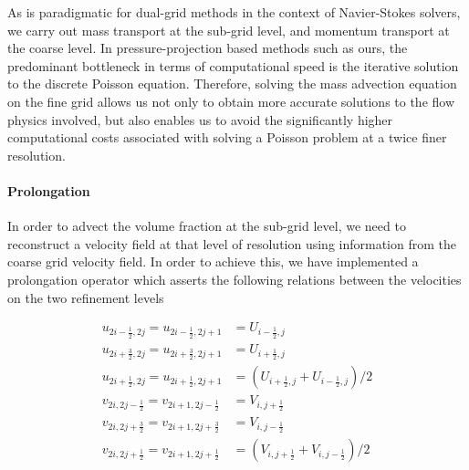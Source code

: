 As is paradigmatic for dual-grid methods in the context of 
Navier-Stokes solvers, we carry out mass transport 
at the sub-grid level, and momentum transport at the coarse level. 
In pressure-projection based methods such as ours, the predominant 
bottleneck in terms of computational speed is the 
iterative solution to the discrete Poisson equation. 
Therefore, solving the mass advection equation on the fine grid 
allows us not only to obtain more accurate solutions to the flow physics 
involved, but also enables us to avoid the significantly higher  
computational costs associated with solving a Poisson problem 
at a twice finer resolution.  

\paragraph{\textbf{Prolongation}}

In order to advect the volume fraction at the sub-grid level, 
we need to reconstruct a velocity field at that level of resolution using 
information from the coarse grid velocity field.
In order to achieve this, we have implemented a prolongation operator 
which asserts the following relations between the velocities on the two refinement levels  

\begin{align}
  	  u_{2i-\frac{1}{2},2j} = u_{2i-\frac{1}{2},2j+1} &= U_{i-\frac{1}{2},j} \\ 
            u_{2i+\frac{3}{2},2j} = u_{2i+\frac{3}{2},2j+1} &= U_{i+\frac{1}{2},j} \\ 
  	  u_{2i+\frac{1}{2},2j} = u_{2i+\frac{1}{2},2j+1} &= \left(U_{i+\frac{1}{2},j} + U_{i-\frac{1}{2},j}\right) / 2 \\
  	  v_{2i,2j-\frac{1}{2}} = v_{2i+1,2j-\frac{1}{2}} &= V_{i,j+\frac{1}{2}} \\ 
            v_{2i,2j+\frac{3}{2}} = v_{2i+1,2j+\frac{3}{2}} &= V_{i,j-\frac{1}{2}} \\
  	  v_{2i,2j+\frac{1}{2}} = v_{2i+1,2j+\frac{1}{2}} &= \left(V_{i,j+\frac{1}{2}} + V_{i,j-\frac{1}{2}}\right) / 2 
\end{align}


